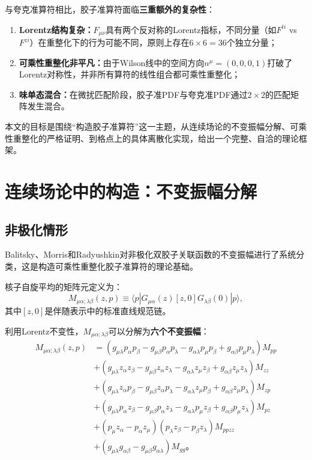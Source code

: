 \documentclass[12pt,a4paper]{ctexart}
\theoremstyle{definition}
\begin{document}
与夸克准算符相比，胶子准算符面临\textbf{三重额外的复杂性}\cite{Zhang2019,Li2018multiplicative}：
\begin{enumerate}
    \item \textbf{Lorentz结构复杂：}$F_{\mu\nu}$具有两个反对称的Lorentz指标，不同分量（如$F^{ti}$ vs $F^{zi}$）在重整化下的行为可能不同，原则上存在$6\times6=36$个独立分量；
    \item \textbf{可乘性重整化非平凡：}由于Wilson线中的空间方向$n^\mu=(0,0,0,1)$打破了Lorentz对称性，并非所有算符的线性组合都可乘性重整化；
    \item \textbf{味单态混合：}在微扰匹配阶段，胶子准PDF与夸克准PDF通过$2\times2$的匹配矩阵发生混合。
\end{enumerate}

本文的目标是围绕``构造胶子准算符''这一主题，从连续场论的不变振幅分解、可乘性重整化的严格证明、到格点上的具体离散化实现，给出一个完整、自洽的理论框架。

\section{连续场论中的构造：不变振幅分解}

\subsection{非极化情形}

Balitsky、Morris和Radyushkin\cite{Balitsky2020}对非极化双胶子关联函数的不变振幅进行了系统分类，这是构造可乘性重整化胶子准算符的理论基础。

核子自旋平均的矩阵元定义为：
\begin{equation}
M_{\mu\alpha;\lambda\beta}(z, p) \equiv \langle p| G_{\mu\alpha}(z) [z, 0] G_{\lambda\beta}(0) |p\rangle,
\label{eq:M_def}
\end{equation}
其中$[z,0]$是伴随表示中的标准直线规范链。

利用Lorentz不变性，$M_{\mu\alpha;\lambda\beta}$可以分解为\textbf{六个不变振幅}\cite{Balitsky2020}：
\begin{equation}
\begin{aligned}
M_{\mu\alpha;\lambda\beta}(z, p) &=
(g_{\mu\lambda}p_\alpha p_\beta - g_{\mu\beta}p_\alpha p_\lambda - g_{\alpha\lambda}p_\mu p_\beta + g_{\alpha\beta}p_\mu p_\lambda) M_{pp} \\
&+ (g_{\mu\lambda}z_\alpha z_\beta - g_{\mu\beta}z_\alpha z_\lambda - g_{\alpha\lambda}z_\mu z_\beta + g_{\alpha\beta}z_\mu z_\lambda) M_{zz} \\
&+ (g_{\mu\lambda}z_\alpha p_\beta - g_{\mu\beta}z_\alpha p_\lambda - g_{\alpha\lambda}z_\mu p_\beta + g_{\alpha\beta}z_\mu p_\lambda) M_{zp} \\
&+ (g_{\mu\lambda}p_\alpha z_\beta - g_{\mu\beta}p_\alpha z_\lambda - g_{\alpha\lambda}p_\mu z_\beta + g_{\alpha\beta}p_\mu z_\lambda) M_{pz} \\
&+ (p_\mu z_\alpha - p_\alpha z_\mu)(p_\lambda z_\beta - p_\beta z_\lambda) M_{ppzz} \\
&+ (g_{\mu\lambda}g_{\alpha\beta} - g_{\mu\beta}g_{\alpha\lambda}) M_{gg}。
\end{aligned}
\label{eq:invariant_amplitudes}
\end{equation}
\end{document}
